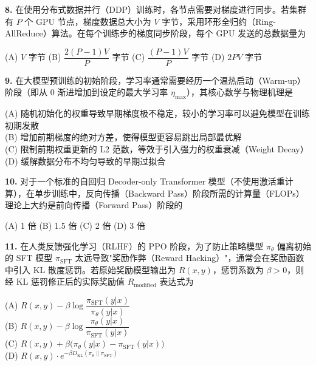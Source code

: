 \documentclass[a4paper]{ctexart}
\begin{document}
\vspace{0.5em}

\noindent\textbf{8.} 在使用分布式数据并行（DDP）训练时，各节点需要对梯度进行同步。若集群有 $P$ 个 GPU 节点，梯度数据总大小为 $V$ 字节，采用环形全归约（Ring-AllReduce）算法。在每个训练步的梯度同步阶段，每个 GPU 发送的总数据量为

\noindent\hspace{1em}(A) $V$ 字节 \quad (B) $\dfrac{2(P-1)V}{P}$ 字节 \quad (C) $\dfrac{(P-1)V}{P}$ 字节 \quad (D) $2PV$ 字节

\vspace{0.5em}

\noindent\textbf{9.} 在大模型预训练的初始阶段，学习率通常需要经历一个温热启动（Warm-up）阶段（即从 0 渐进增加到设定的最大学习率 $\eta_{\max}$），其核心数学与物理机理是

\noindent\hspace{1em}(A) 随机初始化的权重导致早期梯度极不稳定，较小的学习率可以避免模型在训练初期发散 \\
\noindent\hspace{1em}(B) 增加前期梯度的绝对方差，使得模型更容易跳出局部最优解 \\
\noindent\hspace{1em}(C) 限制前期权重更新的 L2 范数，等效于引入强力的权重衰减（Weight Decay） \\
\noindent\hspace{1em}(D) 缓解数据分布不均匀导致的早期过拟合

\vspace{0.5em}

\noindent\textbf{10.} 对于一个标准的自回归 Decoder-only Transformer 模型（不使用激活重计算），在单步训练中，反向传播（Backward Pass）阶段所需的计算量（FLOPs）理论上大约是前向传播（Forward Pass）阶段的

\noindent\hspace{1em}(A) 1 倍 \quad (B) 1.5 倍 \quad (C) 2 倍 \quad (D) 3 倍

\vspace{0.5em}

\noindent\textbf{11.} 在人类反馈强化学习（RLHF）的 PPO 阶段，为了防止策略模型 $\pi_\theta$ 偏离初始的 SFT 模型 $\pi_{\mathrm{SFT}}$ 太远导致"奖励作弊（Reward Hacking）"，通常会在奖励函数中引入 KL 散度惩罚。若原始奖励模型输出为 $R(x, y)$，惩罚系数为 $\beta > 0$，则经 KL 惩罚修正后的实际奖励值 $R_{\mathrm{modified}}$ 表达式为

\noindent\hspace{1em}(A) $R(x, y) - \beta\log\dfrac{\pi_{\mathrm{SFT}}(y|x)}{\pi_\theta(y|x)}$ \\
\noindent\hspace{1em}(B) $R(x, y) - \beta\log\dfrac{\pi_\theta(y|x)}{\pi_{\mathrm{SFT}}(y|x)}$ \\
\noindent\hspace{1em}(C) $R(x, y) + \beta\bigl(\pi_\theta(y|x) - \pi_{\mathrm{SFT}}(y|x)\bigr)$ \\
\noindent\hspace{1em}(D) $R(x, y) \cdot e^{-\beta D_{\mathrm{KL}}(\pi_\theta \| \pi_{\mathrm{SFT}})}$
\end{document}

